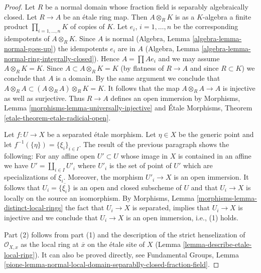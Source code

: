\documentclass[10pt,a4paper]{amsart}
\theoremstyle{plain}
\theoremstyle{definition}
\theoremstyle{remark}
\numberwithin{equation}{subsection}
\begin{document}
\begin{proof}
Let $R$ be a normal domain whose fraction field is separably algebraically
closed. Let $R \to A$ be an \'etale ring map. Then
$A \otimes_R K$ is as a $K$-algebra a finite product
$\prod_{i = 1, \ldots, n} K$ of copies of $K$. Let $e_i$, $i = 1, \ldots, n$
be the corresponding idempotents of $A \otimes_R K$. Since $A$ is normal
(Algebra, Lemma \ref{algebra-lemma-normal-goes-up})
the idempotents $e_i$ are in $A$
(Algebra, Lemma \ref{algebra-lemma-normal-ring-integrally-closed}).
Hence $A = \prod Ae_i$ and we may assume $A \otimes_R K = K$.
Since $A \subset A \otimes_R K = K$ (by flatness of $R \to A$ and
since $R \subset K$) we conclude that $A$ is a domain.
By the same argument we conclude that
$A \otimes_R A \subset (A \otimes_R A) \otimes_R K = K$.
It follows that the map $A \otimes_R A \to A$ is
injective as well as surjective. Thus $R \to A$ defines an
open immersion by
Morphisms, Lemma \ref{morphisms-lemma-universally-injective}
and
\'Etale Morphisms, Theorem \ref{etale-theorem-etale-radicial-open}.

\medskip\noindent
Let $f : U \to X$ be a separated \'etale morphism. Let $\eta \in X$
be the generic point and let $f^{-1}(\{\eta\}) = \{\xi_i\}_{i \in I}$.
The result of the previous paragraph shows the following:
For any affine open $U' \subset U$ whose image in $X$ is contained in
an affine we have $U' = \coprod_{i \in I} U'_i$ where $U'_i$
is the set of point of $U'$ which are specializations of $\xi_i$.
Moreover, the morphism $U'_i \to X$ is an open immersion.
It follows that $U_i = \overline{\{\xi_i\}}$ is an open and closed
subscheme of $U$ and that $U_i \to X$ is locally on the source
an isomorphism. By Morphisms,
Lemma \ref{morphisms-lemma-distinct-local-rings}
the fact that $U_i \to X$ is separated, implies that
$U_i \to X$ is injective and we conclude that $U_i \to X$
is an open immersion, i.e., (1) holds.

\medskip\noindent
Part (2) follows from part (1) and the description of the strict
henselization of $\mathcal{O}_{X, x}$ as the local ring at $\overline{x}$
on the \'etale site of $X$ (Lemma \ref{lemma-describe-etale-local-ring}).
It can also be proved directly, see
Fundamental Groups, Lemma
\ref{pione-lemma-normal-local-domain-separablly-closed-fraction-field}.
\end{proof}
\end{document}

